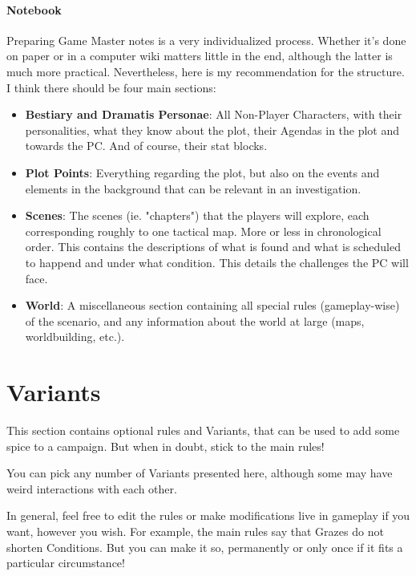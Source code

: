 \paragraph{Notebook}

Preparing Game Master notes is a very individualized process. Whether it's done on paper or in a computer wiki matters little in the end, although the latter is much more practical. Nevertheless, here is my recommendation for the structure. I think there should be four main sections:

\begin{itemize}
    \item \textbf{Bestiary and Dramatis Personae}: All Non-Player Characters, with their personalities, what they know about the plot, their Agendas in the plot and towards the PC. And of course, their stat blocks. 
    \item \textbf{Plot Points}: Everything regarding the plot, but also on the events and elements in the background that can be relevant in an investigation. 
    \item \textbf{Scenes}: The scenes (ie. "chapters") that the players will explore, each corresponding roughly to one tactical map. More or less in chronological order. This contains the descriptions of what is found and what is scheduled to happend and under what condition. This details the challenges the PC will face. 
    \item \textbf{World}: A miscellaneous section containing all special rules (gameplay-wise) of the scenario, and any information about the world at large (maps, worldbuilding, etc.).
\end{itemize}

	

\section{Variants}

This section contains optional rules and Variants, that can be used to add some spice to a campaign. But when in doubt, stick to the main rules!

You can pick any number of Variants presented here, although some may have weird interactions with each other.

\begin{rpg-examplebox}
    In general, feel free to edit the rules or make modifications live in gameplay if you want, however you wish. For example, the main rules say that Grazes do not shorten Conditions. But you can make it so, permanently or only once if it fits a particular circumstance!
\end{rpg-examplebox}


